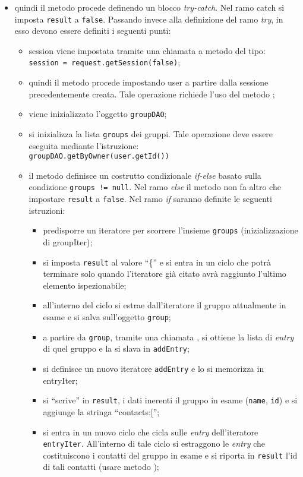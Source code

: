 \begin{description}
\begin{itemize}
		\item quindi il metodo procede definendo un blocco \textit{try-catch}. Nel ramo catch si imposta \texttt{result} a \texttt{false}. Passando invece alla definizione del ramo \textit{try}, in esso devono essere definiti i seguenti punti:
		\begin{itemize}
			\item session viene impostata tramite una chiamata a metodo del tipo:\\
			\verb|session = request.getSession(false)|;
			\item quindi il metodo procede impostando user a partire dalla sessione precedentemente creata. Tale operazione richiede l'uso del metodo ;
			\item viene inizializzato l'oggetto \texttt{groupDAO};
			\item si inizializza la lista \texttt{groups} dei gruppi. Tale operazione deve essere eseguita mediante l'istruzione:\\
			\verb|groupDAO.getByOwner(user.getId())|
			\item il metodo definisce un costrutto condizionale \textit{if-else} basato sulla condizione \texttt{groups != null}. Nel ramo \textit{else} il metodo non fa altro che impostare \texttt{result} a \texttt{false}. Nel ramo \textit{if} saranno definite le seguenti istruzioni:	
			\begin{itemize}
				\item predisporre un iteratore per scorrere l'insieme \texttt{groups} (inizializzazione di groupIter);
				\item si imposta \texttt{result} al valore ``\{'' e si entra in un ciclo  che potrà terminare solo quando l'iteratore già citato avrà raggiunto l'ultimo elemento ispezionabile;
				\item all'interno del ciclo si estrae dall'iteratore il gruppo attualmente in esame e si salva sull'oggetto \texttt{group};
				\item a partire da \texttt{group}, tramite una chiamata , si ottiene la lista di \textit{entry} di quel gruppo e la si slava in \texttt{addEntry};
				\item si definisce un nuovo iteratore \texttt{addEntry}  e lo si memorizza in entryIter;
				\item si ``scrive'' in \texttt{result}, i dati inerenti il gruppo in esame (\texttt{name}, \texttt{id}) e si aggiunge la stringa ``contacts:['';
				\item si entra in un nuovo ciclo  che cicla sulle \textit{entry} dell'iteratore \texttt{entryIter}. All'interno di tale ciclo si estraggono le \textit{entry} che costituiscono i contatti del gruppo in esame e si riporta in \texttt{result} l'id di tali contatti (usare metodo );

\end{itemize}
\end{itemize}
\end{itemize}
\end{description}
